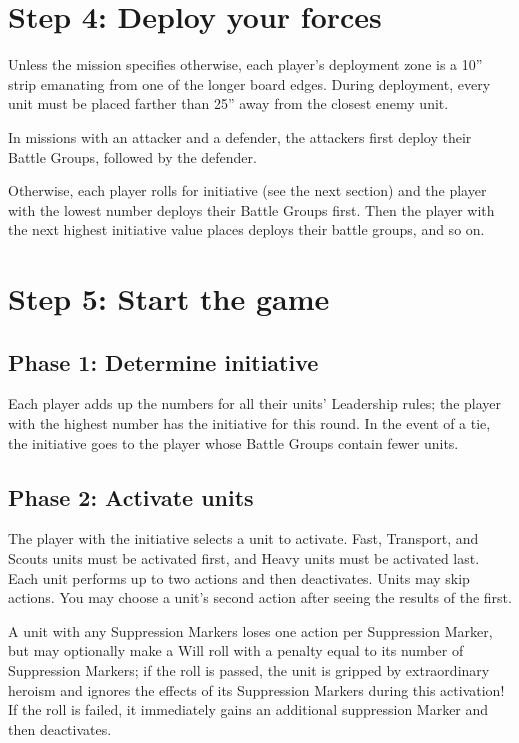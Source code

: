 \begin{multicols}{2}
\section*{Step 4: Deploy your forces}
Unless the mission specifies otherwise, each player's deployment zone is a 10'' strip emanating from one of the longer board edges. During deployment, every unit must be placed farther than 25'' away from the closest enemy unit.

In missions with an attacker and a defender, the attackers first deploy their Battle Groups, followed by the defender.

Otherwise, each player rolls for initiative (see the next section) and the player with the lowest number deploys their Battle Groups first. Then the player with the next highest initiative value places deploys their battle groups, and so on.




\section*{Step 5: Start the game}

\subsection*{Phase 1: Determine initiative}

Each player adds up the numbers for all their units' Leadership rules; the player with the highest number has the initiative for this round. In the event of a tie, the initiative goes to the player whose Battle Groups contain fewer units.

\subsection*{Phase 2: Activate units}

The player with the initiative selects a unit to activate. Fast, Transport, and Scouts units must be activated first, and Heavy units must be activated last. Each unit performs up to two actions and then deactivates. Units may skip actions. You may choose a unit's second action after seeing the results of the first.

A unit with any Suppression Markers loses one action per Suppression Marker, but may optionally make a Will roll with a penalty equal to its number of Suppression Markers; if the roll is passed, the unit is gripped by extraordinary heroism and ignores the effects of its Suppression Markers during this activation! If the roll is failed, it immediately gains an additional suppression Marker and then deactivates.


\end{multicols}
